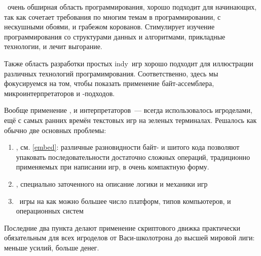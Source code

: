 \clearpage
{}\secdown

\clearpage
{}\ очень обширная область
программирования, хорошо подходит для начинающих,
так как сочетает требования по многим темам в программировании, с нескушными
обоями, и грабежом корованов. Стимулирует изучение программирования со
структурами данных и алгоритмами, прикладные технологии, и лечит
выгорание.

Также область разработки простых indy\ игр хорошо подходит для
иллюстрации различных технологий програмимрования. Соответственно, здесь мы
фокусируемся на том, чтобы показать применение байт-ассем\-блера,
микроинтерпретаторов и \F-подходов.

Вообще применение , и интерпретаторов\ --- всегда
использовалось игроделами, ещё с самых ранних времён текстовых игр на зеленых
терминалах. Решалось как обычно две основных проблемы:
\begin{enumerate}[nosep]
    \item {}, см. \ref{embed}:
    различные разновидности байт- и шитого кода позволяют упаковать
    последовательности достаточно сложных операций, традиционно применяемых при
    написании игр, в очень компактную форму.
    \item {}, специально
    заточенного на описание логики и механики игр
    \item {}\ игры на как можно большее число
    платформ, типов компьютеров, и операционных систем
\end{enumerate}

\medskip\noindent
Последние два пункта делают применение скриптового движка практически
обязательным для всех игроделов от Васи-школотрона до высшей мировой лиги:
меньше усилий, больше денег.



\secup
